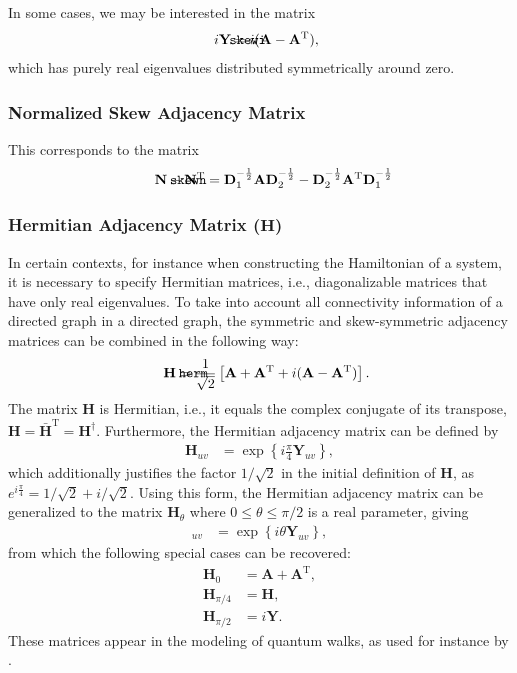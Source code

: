\documentclass{article}
\def\mathnote#1{%
  \tag*{\rlap{\hspace\marginparsep\smash{\parbox[t]{\marginparwidth}{#1}}}}
}
\begin{document}
In some cases, we may be interested in the matrix
\begin{align}
  \mathnote{\texttt{skewi}}
  i \mathbf Y &= i ( \mathbf A - \mathbf A^{\mathrm T} ),
\end{align}
which has purely real eigenvalues distributed symmetrically around
zero. 

\subsubsection{Normalized Skew Adjacency Matrix}
\label{sec:matrix.skewn}
This corresponds to the matrix
\begin{align}
  \mathnote{\texttt{skewn}}
  \mathbf N - \mathbf N^{\mathrm T} = 
  \mathbf D_1^{-\frac 1 2} \mathbf A \mathbf D_2^{-\frac 1 2} - 
  \mathbf D_2^{-\frac 1 2} \mathbf A^{\mathrm T} \mathbf D_1^{-\frac 1 2} 
\end{align}

\subsubsection{Hermitian Adjacency Matrix ($\mathbf H$)}
In certain contexts, for instance when constructing the Hamiltonian of a
system, it is necessary to specify Hermitian matrices, i.e.,
diagonalizable matrices that have only real eigenvalues.  To take into
account all connectivity information of a directed graph in a
directed graph, the symmetric and skew-symmetric adjacency matrices can
be combined in the following way:
\begin{align}
  \mathnote{\texttt{herm}}
  \mathbf H &= \frac 1 {\sqrt 2} \left[
  \mathbf A + \mathbf A^{\mathrm T} + i(\mathbf A - \mathbf A^{\mathrm T})
  \right]. 
\end{align}
The matrix $\mathbf H$ is Hermitian, i.e., it equals the complex
conjugate of its transpose, $\mathbf H = \mathbf {\bar H}^{\mathrm T} =
\mathbf H^{\dagger}$.
Furthermore, the Hermitian adjacency matrix can be defined by
\begin{align}
  \mathbf H_{uv} &= \exp\left\{i \frac \pi 4 \mathbf Y_{uv}\right\},
\end{align}
which additionally justifies the factor $1/\sqrt 2$ in the initial
definition of $\mathbf H$, as $e^{i \frac \pi 4} = 1/\sqrt 2 + i/\sqrt
2$.  Using this form, the Hermitian adjacency matrix can be generalized
to the matrix $\mathbf H_\theta$ where $0 \leq \theta \leq \pi/2$ is a
real parameter, giving 
\begin{align}
  [\mathbf H_{\theta}]_{uv} &= \exp\left\{i \theta \mathbf Y_{uv} \right\},  
\end{align}
from which the following special cases can be recovered:
\begin{align}
  \mathbf H_0 &= \mathbf A + \mathbf A^{\mathrm T}, \\
  \mathbf H_{\pi/4} &= \mathbf H, \\
  \mathbf H_{\pi/2} &= i \mathbf Y.
\end{align}
These matrices appear in the modeling of quantum walks, as used for
instance by \cite{toedtli:ctqw}.  
\end{document}
